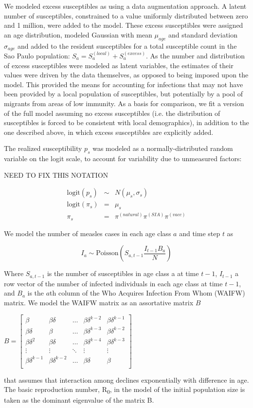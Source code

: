 We modeled excess susceptibles as using a data augmentation approach. A latent number of susceptibles, constrained to a value uniformly distributed between zero and 1 million, were added to the model. These excess susceptibles were assigned an age distribution, modeled Gaussian with mean \(\mu_{age}\) and standard deviation \(\sigma_{age}\) and added to the resident susceptibles for a total susceptible count in the Sao Paulo population: \(S_a = S_a^{(local)} + S_a^{(excess)}\). As the number and distribution of excess susceptibles were modeled as latent variables, the estimates of their values were driven by the data themselves, as opposed to being imposed upon the model. This provided the means for accounting for infections that may not have been provided by a local population of susceptibles, but potentially by a pool of migrants from areas of low immunity. As a basis for comparison, we fit a version of the full model assuming no excess susceptibles (i.e. the distribution of susceptibles is forced to be consistent with local demographics), in addition to the one described above, in which excess susceptibles are explicitly added.

The realized susceptibility \(p_s\) was modeled as a normally-distributed random variable on the logit scale, to account for variability due to unmeasured factors:

NEED TO FIX THIS NOTATION

\begin{eqnarray}
\text{logit}(p_s) &\sim& N(\mu_s, \sigma_s) \\
\text{logit}(\pi_s) &=& \mu_s \\
\pi_s &=& \pi^{(natural)} \pi^{(SIA)} \pi^{(vacc)}
\end{eqnarray}


We model the number of measles cases in each age class \(a\) and time step \(t\) as 

\[I_a \sim \text{Poisson}\left(S_{a,t-1} \frac{I_{t-1}B_a}{N} \right)\] 

Where \(S_{a,t-1}\) is the number of susceptibles in age class a at time \(t-1\), \(I_{t-1}\) a row vector of the number of infected individuals in each age class at time \(t-1\), and \(B_a\) is the \(a\)th column of the Who Acquires Infection From Whom (WAIFW) matrix.  We model the WAIFW matrix as an assortative matrix \(B\)

\(B = \left[{
\begin{array}{c}
  {\beta} & {\beta \delta} & \ldots & {\beta \delta^{k-2}} & {\beta \delta^{k-1}}  \\
  {\beta \delta} & {\beta} & \ldots & {\beta \delta^{k-3}} & {\beta \delta^{k-2}} \\
{\beta \delta^2} & {\beta \delta} & \ldots & {\beta \delta^{k-4}} & {\beta \delta^{k-3}}  \\
  \vdots & \vdots & \ddots & \vdots & \vdots \\
  {\beta \delta^{k-1}} & {\beta \delta^{k-2}} & \ldots & {\beta \delta} & {\beta}  \\
\end{array}
}\right]\)

that assumes that interaction among declines exponentially with
difference in age. The basic reproduction number, R\textsubscript{0}, in
the model of the initial population size is taken as the dominant
eigenvalue of the matrix B.